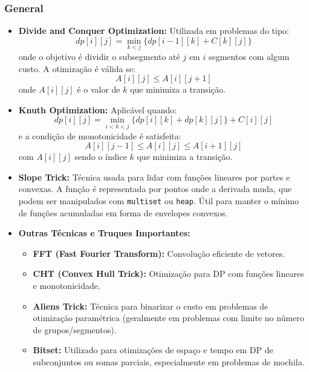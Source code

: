 \subsubsection{General}

\begin{small}
\begin{itemize}
    \item \textbf{Divide and Conquer Optimization:} Utilizada em problemas do tipo:
    \[
    dp[i][j] = \min_{k < j} \{ dp[i - 1][k] + C[k][j] \}
    \]
    onde o objetivo é dividir o subsegmento até $j$ em $i$ segmentos com algum custo. A otimização é válida se:
    \[
    A[i][j] \leq A[i][j+1]
    \]
    onde $A[i][j]$ é o valor de $k$ que minimiza a transição.

    \item \textbf{Knuth Optimization:} Aplicável quando:
    \[
    dp[i][j] = \min_{i < k < j} \{ dp[i][k] + dp[k][j] \} + C[i][j]
    \]
    e a condição de monotonicidade é satisfeita:
    \[
    A[i][j-1] \leq A[i][j] \leq A[i+1][j]
    \]
    com $A[i][j]$ sendo o índice $k$ que minimiza a transição.

    \item \textbf{Slope Trick:} Técnica usada para lidar com funções lineares por partes e convexas. A função é representada por pontos onde a derivada muda, que podem ser manipulados com \texttt{multiset} ou \texttt{heap}. Útil para manter o mínimo de funções acumuladas em forma de envelopes convexos.

    \item \textbf{Outras Técnicas e Truques Importantes:}
    \begin{itemize}
        \item \textbf{FFT (Fast Fourier Transform):} Convolução eficiente de vetores.
        \item \textbf{CHT (Convex Hull Trick):} Otimização para DP com funções lineares e monotonicidade.
        \item \textbf{Aliens Trick:} Técnica para binarizar o custo em problemas de otimização paramétrica (geralmente em problemas com limite no número de grupos/segmentos).
        \item \textbf{Bitset:} Utilizado para otimizações de espaço e tempo em DP de subconjuntos ou somas parciais, especialmente em problemas de mochila.
    \end{itemize}
\end{itemize}
\end{small}

